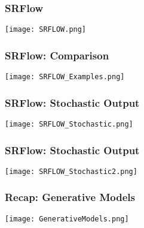 \begin{frame}
    \frametitle{SRFlow}
    \center\texttt{[image: SRFLOW.png]}
\end{frame}

\begin{frame}
    \frametitle{SRFlow: Comparison}
    \center\texttt{[image: SRFLOW\_Examples.png]}
\end{frame}

\begin{frame}
    \frametitle{SRFlow: Stochastic Output}
    \center\texttt{[image: SRFLOW\_Stochastic.png]}
\end{frame}

\begin{frame}
    \frametitle{SRFlow: Stochastic Output}
    \center\texttt{[image: SRFLOW\_Stochastic2.png]}
\end{frame}


\begin{frame}
    \frametitle{Recap: Generative Models}
    \center\texttt{[image: GenerativeModels.png]}
\end{frame}

